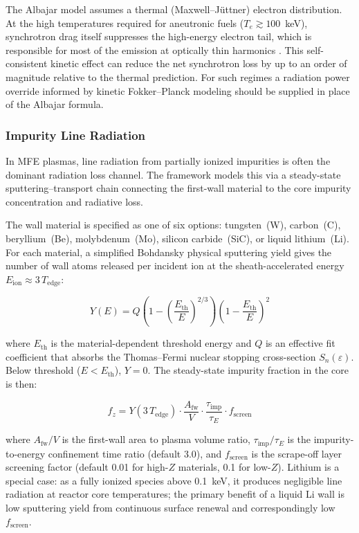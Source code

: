 \documentclass{article}
\begin{document}
The Albajar model assumes a thermal (Maxwell--J\"uttner) electron
distribution. At the high temperatures required for aneutronic fuels
($T_e \gtrsim 100$~keV), synchrotron drag itself suppresses the
high-energy electron tail, which is responsible for most of the
emission at optically thin harmonics \citep{ochs2024}. This
self-consistent kinetic effect can reduce the net synchrotron loss by
up to an order of magnitude relative to the thermal prediction. For
such regimes a radiation power override informed by kinetic
Fokker--Planck modeling should be supplied in place of the
Albajar formula.

\subsubsection{Impurity Line Radiation}
In MFE plasmas, line radiation from partially ionized impurities is
often the dominant radiation loss channel. The framework models this
via a steady-state sputtering--transport chain connecting the
first-wall material to the core impurity concentration and radiative
loss.

The wall material is specified as one of six options: tungsten~(W),
carbon~(C), beryllium~(Be), molybdenum~(Mo), silicon carbide~(SiC),
or liquid lithium~(Li). For each material, a simplified Bohdansky
physical sputtering yield \citep{bohdansky1984, eckstein2007} gives
the number of wall atoms released per incident ion at the
sheath-accelerated energy $E_{\text{ion}} \approx 3\,T_{\text{edge}}$:

\begin{equation}
\label{eq:sputtering}
Y(E) = Q \left(1 - \left(\frac{E_{\text{th}}}{E}\right)^{2/3}\right)
       \left(1 - \frac{E_{\text{th}}}{E}\right)^{2}
\end{equation}

\noindent where $E_{\text{th}}$ is the material-dependent threshold
energy and $Q$ is an effective fit coefficient that absorbs the
Thomas--Fermi nuclear stopping cross-section $S_n(\varepsilon)$. Below
threshold ($E < E_{\text{th}}$), $Y = 0$. The steady-state impurity fraction in the core is then:

\begin{equation}
\label{eq:f-impurity}
f_z = Y(3\,T_{\text{edge}}) \cdot
  \frac{A_{\text{fw}}}{V} \cdot
  \frac{\tau_{\text{imp}}}{\tau_E} \cdot f_{\text{screen}}
\end{equation}

\noindent where $A_{\text{fw}}/V$ is the first-wall area to plasma
volume ratio, $\tau_{\text{imp}}/\tau_E$ is the impurity-to-energy
confinement time ratio (default 3.0), and $f_{\text{screen}}$ is the
scrape-off layer screening factor (default 0.01 for high-$Z$
materials, 0.1 for low-$Z$). Lithium is a special case: as a fully
ionized species above 0.1~keV, it produces negligible line
radiation at reactor core temperatures; the primary benefit of a
liquid Li wall is low sputtering yield from continuous surface renewal
and correspondingly low $f_{\text{screen}}$.
\end{document}

